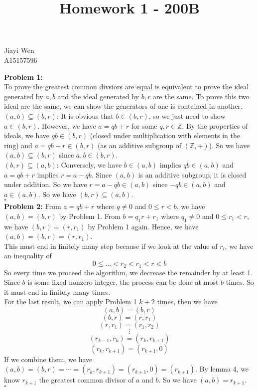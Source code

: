 \documentclass[12pt]{amsart}
\newcommand{\Z}{\mathbb{Z}}
\begin{document}
\title{Homework 1 - 200B}
\maketitle
\begin{center}
    Jiayi Wen\\
    A15157596
\end{center}
\textbf{Problem 1:}\\
To prove the greatest common divsiors are equal is equivalent to prove the ideal generated by $a,b$ and the ideal generated by $b,r$ are the same. To prove this two ideal are the same, we can show the generators of one is contained in another.\\
$(a,b)\subseteq (b,r)$: It is obvious that $b\in (b,r)$, so we just need to show $a\in (b,r)$. However, we have $a=qb+r$ for some $q,r\in\Z$. By the properties of ideals, we have $qb\in (b,r)$ (closed under multiplication with elements in the ring) and $a=qb+r\in (b,r)$ (as an additive subgroup of $(\Z,+)$). So we have $(a,b)\subseteq (b,r)$ since $a,b\in (b,r)$.\\
$(b,r)\subseteq (a,b)$: Conversely, we have $b\in (a,b)$ implies $qb\in (a,b)$ and $a=qb+r$ implies $r=a-qb$. Since $(a,b)$ is an additive subgroup, it is closed under addition. So we have $r=a-qb\in (a,b)$ since $-qb\in (a,b)$ and $a\in (a,b)$. So we have $(b,r)\subseteq (a,b)$.
\\\phantom{qed}\hfill$\square$\\
\textbf{Problem 2:} From $a=qb+r$ where $q\neq 0$ and $0\leq r<b$, we have $(a,b)=(b,r)$ by Problem 1. From $b=q_1r+r_1$ where $q_1\neq 0$ and $0\leq r_1<r$, we have $(b,r)=(r,r_1)$ by Problem 1 again. Hence, we have $(a,b)=(b,r)=(r,r_1)$.\\
This must end in finitely many step because if we look at the value of $r_i$, we have an inequality of 
\[0\leq \dots < r_2 < r_1 < r <b\]
So every time we proceed the algorithm, we decrease the remainder by at least 1. Since $b$ is some fixed nonzero integer, the process can be done at most $b$ times. So it must end in finitely many times.\\
For the last result, we can apply Problem 1 $k+2$ times, then we have 
\[(a,b)=(b,r)\]
\[(b,r)=(r,r_1)\]
\[(r,r_1)=(r_1,r_2)\]
\[\vdots\]
\[(r_{k-1},r_k)=(r_k,r_{k+1})\]
\[(r_k,r_{k+1})=(r_{k+1},0)\]
If we combine them, we have $(a,b)=(b,r)=\cdots=(r_k,r_{k+1})=(r_{k+1},0)=(r_{k+1})$. By lemma 4, we know $r_{k+1}$ the greatest common divisor of $a$ and $b$. So we have $(a,b)=r_{k+1}$.
\\\phantom{qed}\hfill$\square$\\
\end{document}
